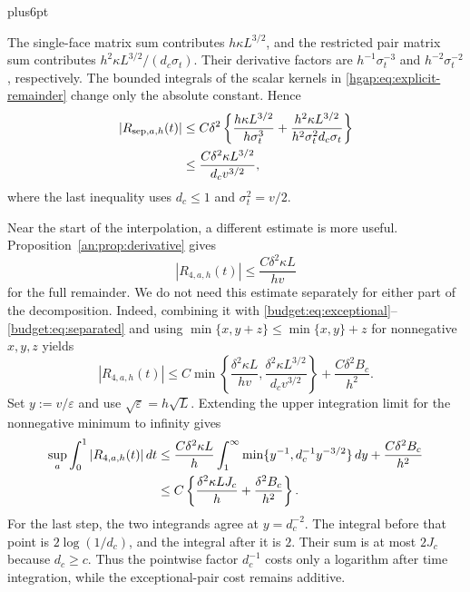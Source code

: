 \documentclass[11pt,letterpaper,twoside,leqno]{article}
\makeatletter
\theoremstyle{bookplain}
\theoremstyle{bookremark}
\renewenvironment{proof}[1][\proofname]{\par
  \pushQED{\qed}\normalfont\topsep6pt plus6pt\relax
  \trivlist\item[\hskip\labelsep\bfseries #1\@addpunct{.}]\ignorespaces
}{\popQED\endtrivlist\@endpefalse}
\makeatother
\begin{document}
\begin{proof}[Proof of Corollary~\ref{cor:correlation-budget}]
The single-face matrix sum contributes $h\kappa L^{3/2}$, and
the restricted pair matrix sum contributes
$h^2\kappa L^{3/2}/(d_c\sigma_t)$. Their derivative factors are
$h^{-1}\sigma_t^{-3}$ and $h^{-2}\sigma_t^{-2}$, respectively.
The bounded integrals of the scalar kernels in
\eqref{hgap:eq:explicit-remainder} change only the absolute
constant. Hence
\begin{align}
 |R_{\mathrm{sep},a,h}(t)|
 &\le C\delta^2\left\{
    \frac{h\kappa L^{3/2}}{h\sigma_t^3}
   +\frac{h^2\kappa L^{3/2}}{h^2\sigma_t^2d_c\sigma_t}
                    \right\}\notag\\
 &\le\frac{C\delta^2\kappa L^{3/2}}{d_cv^{3/2}},
 \label{budget:eq:separated}
\end{align}
where the last inequality uses $d_c\le1$ and $\sigma_t^2=v/2$.

Near the start of the interpolation, a different estimate is
more useful. Proposition~\ref{an:prop:derivative} gives
\[
 |R_{4,a,h}(t)|\le\frac{C\delta^2\kappa L}{hv}
\]
for the full remainder. We do not need this estimate separately
for either part of the decomposition. Indeed, combining it with
\eqref{budget:eq:exceptional}--\eqref{budget:eq:separated} and using
$\min\{x,y+z\}\le\min\{x,y\}+z$ for nonnegative $x,y,z$ yields
\[
 |R_{4,a,h}(t)|\le
 C\min\left\{\frac{\delta^2\kappa L}{hv},
              \frac{\delta^2\kappa L^{3/2}}{d_cv^{3/2}}\right\}
 +\frac{C\delta^2B_c}{h^2}.
\]
Set $y:=v/\varepsilon$ and use $\sqrt\varepsilon=h\sqrt L$.
Extending the upper integration limit for the nonnegative minimum
to infinity gives
\begin{align}
 \sup_a\int_0^1|R_{4,a,h}(t)|\,dt
 &\le\frac{C\delta^2\kappa L}{h}
   \int_1^\infty\min\{y^{-1},d_c^{-1}y^{-3/2}\}\,dy
   +\frac{C\delta^2B_c}{h^2}\notag\\
 &\le C\left\{\frac{\delta^2\kappa LJ_c}{h}
                  +\frac{\delta^2B_c}{h^2}\right\}.
 \label{budget:eq:integrated}
\end{align}
For the last step, the two integrands agree at $y=d_c^{-2}$.
The integral before that point is $2\log(1/d_c)$, and the integral
after it is $2$. Their sum is at most $2J_c$ because $d_c\ge c$.
Thus the pointwise factor $d_c^{-1}$ costs only a logarithm after
time integration, while the exceptional-pair cost remains additive.


\end{proof}
\end{document}
